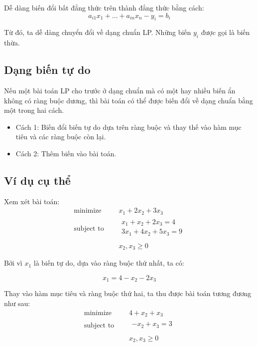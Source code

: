 Dễ dàng biến đổi bất đẳng thức trên thành đẳng thức bằng cách:
\begin{equation}
    a_{i1} x_1 + \dots + a_{in} x_n - y_i = b_i
\end{equation}

Từ đó, ta dễ dàng chuyển đổi về dạng chuẩn LP. Những biến $y_i$ được gọi là biến thừa.

\subsection{Dạng biến tự do}

Nếu một bài toán LP cho trước ở dạng chuẩn mà có một hay nhiều biến ẩn không có ràng buộc dương, thì bài toán có thể được biến đổi về dạng chuẩn bằng một trong hai cách.
\begin{itemize}
    \item Cách 1: Biến đổi biến tự do dựa trên ràng buộc và thay thế vào hàm mục tiêu và các ràng buộc còn lại.
    \item Cách 2: Thêm biến vào bài toán.
\end{itemize}

\subsection{Ví dụ cụ thể}

Xem xét bài toán:
\begin{equation}
    \label{eq:ex1}
    \begin{aligned}
        \text{minimize } \quad & x_1 + 2x_2 + 3x_3 \\
        \text{subject to }\quad &
            \begin{array}{c}
            x_1 + x_2 + 2x_3 = 4 \\
            3x_1 + 4x_2 + 5x_3 = 9 \\
            \end{array} \\ 
            & x_2, x_3 \geq 0
    \end{aligned}   
\end{equation}

Bởi vì $x_1$ là biến tự do, dựa vào ràng buộc thứ nhất, ta có:

\begin{equation}
    x_1 = 4 - x_2 - 2x_3
\end{equation}

Thay vào hàm mục tiêu và ràng buộc thứ hai, ta thu được bài toán tương đương như sau:
\begin{equation}
    \label{eq:ex2}
    \begin{aligned}
        \text{minimize } \quad & 4 + x_2 + x_3 \\
        \text{subject to }\quad &
            \begin{array}{c}
            - x_2 + x_3 = 3 \\
            \end{array} \\ 
            & x_2, x_3 \geq 0
    \end{aligned}   
\end{equation}

